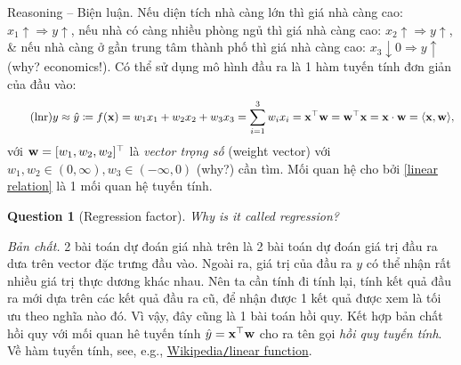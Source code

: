 \documentclass{article}
\newtheorem{question}{Question}
\begin{document}
{\sf Reasoning -- Biện luận.} Nếu diện tích nhà càng lớn thì giá nhà càng cao: $x_1\uparrow\Rightarrow y\uparrow$, nếu nhà có càng nhiều phòng ngủ thì giá nhà càng cao: $x_2\uparrow\Rightarrow y\uparrow$, \& nếu nhà càng ở gần trung tâm thành phố thì giá nhà càng cao: $x_3\downarrow0\Rightarrow y\uparrow$ (why? economics!). Có thể sử dụng mô hình đầu ra là 1 hàm tuyến tính đơn giản của đầu vào:
\begin{equation}
	\label{linear relation}
	\tag{lnr}
	y\approx\hat{y}\coloneqq f({\bf x}) = w_1x_1 + w_2x_2 + w_3x_3 = \sum_{i=1}^3 w_ix_i = {\bf x}^\top{\bf w} = {\bf w}^\top{\bf x} = {\bf x}\cdot{\bf w} = \langle{\bf x},{\bf w}\rangle,
\end{equation}
với ${\bf w} = [w_1,w_2,w_2]^\top$ là {\it vector trọng số} (weight vector) với $w_1,w_2\in(0,\infty),w_3\in(-\infty,0)$ (why?) cần tìm. Mối quan hệ cho bởi \eqref{linear relation} là 1 mối quan hệ tuyến tính.

\begin{question}[Regression factor]
	Why is it called \emph{regression}?
\end{question}
{\it Bản chất.} 2 bài toán dự đoán giá nhà trên là 2 bài toán dự đoán giá trị đầu ra dưa trên vector đặc trưng đầu vào. Ngoài ra, giá trị của đầu ra $y$ có thể nhận rất nhiều giá trị thực dương khác nhau. Nên ta cần tính đi tính lại, tính kết quả đầu ra mới dựa trên các kết quả đầu ra cũ, để nhận được 1 kết quả được xem là tối ưu theo nghĩa nào đó. Vì vậy, đây cũng là 1 bài toán hồi quy. Kết hợp bản chất hồi quy với mối quan hê tuyến tính $\hat{y} = {\bf x}^\top{\bf w}$ cho ra tên gọi {\it hồi quy tuyến tính}. Về hàm tuyến tính, see, e.g., \href{https://en.wikipedia.org/wiki/Linear_function}{Wikipedia{\tt/}linear function}.
\end{document}
